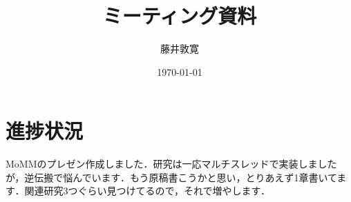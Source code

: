 \documentclass[a4j,10pt]{jarticle}
\title{ミーティング資料}
\author{藤井敦寛}
\date{\today}
\begin{document}
\maketitle

\section{進捗状況}
MoMMのプレゼン作成しました．研究は一応マルチスレッドで実装しましたが，逆伝搬で悩んでいます．もう原稿書こうかと思い，とりあえず1章書いてます．関連研究3つぐらい見つけてるので，それで増やします．



\end{document}
